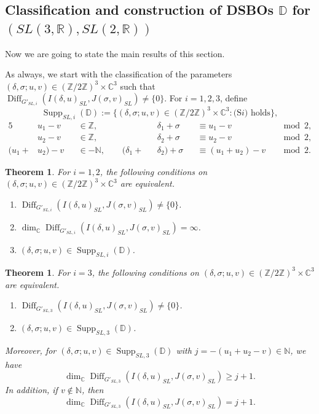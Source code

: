 \documentclass[a4paper,11pt,reqno]{amsart}
\newcommand{\DD}{\mathbb{D}}
\newcommand{\0}{{\bf 0}}
\newcommand{\N}{\mathbb{N}}
\newcommand{\Z}{\mathbb{Z}}
\newcommand{\R}{\mathbb{R}}
\newcommand{\C}{\mathbb{C}}
\newcommand{\1}{{\bf 1}}
\DeclareMathOperator{\Supp}{Supp}
\DeclareMathOperator{\Diff}{Diff}
\theoremstyle{plain}
\newtheorem{theorem}[equation]{Theorem}
\theoremstyle{definition}
\numberwithin{equation}{section}
\theoremstyle{definition}
\begin{document}
\subsection{Classification and construction of DSBOs \texorpdfstring{$\DD$}{D} 
for \texorpdfstring{$(SL(3,\R), SL(2,\R))$}{(SL(3,R),SL(2,R))}}\label{sec:class-const-SL}

Now we are going to state the main results of this section.

As always, we start with the classification of the parameters 
$(\delta,\sigma; u, v) \in (\Z/2\Z)^3\times \C^3$ such that
$\Diff_{G'_{SL,i}}(I(\delta,u)_{SL}, J(\sigma,v)_{SL})\neq \{0\}$.
For $i=1,2,3$, define
\begin{equation*}
\Supp_{SL,i}(\DD):=\{(\delta,\sigma; u, v) \in (\Z/2\Z)^3\times \C^3: 
\text{(S$i$)  holds}  \},
\end{equation*}
\begin{alignat}{5}
&u_1-v &&\in \Z,
\qquad
&&\delta_1+\sigma
&&\equiv u_1-v &&\bmod{2},
\tag{S1}\\
&u_2-v &&\in \Z,
\qquad
&&\delta_2+\sigma &&\equiv u_2-v &&\bmod{2},
\tag{S2}\\
(u_1+&u_2)-v &&\in -\N,
\qquad
(\delta_1+&&\delta_2)+\sigma &&\equiv (u_1+u_2)-v &&\bmod{2}.
\tag{S3}
\end{alignat}

\begin{theorem}\label{thm:classSL12}
For $i=1,2$, the following conditions on $(\delta,\sigma; u, v)  
\in (\Z/2\Z)^3\times \C^3$ are equivalent.
\begin{enumerate}[label=\normalfont{(\roman*)}]
\item $\Diff_{G'_{SL,i}}(I(\delta,u)_{SL}, J(\sigma,v)_{SL})\neq \{0\}$.
\item $\dim_\C\Diff_{G'_{SL,i}}(I(\delta,u)_{SL}, J(\sigma,v)_{SL})=\infty$.
\item $(\delta,\sigma; u, v) \in \Supp_{SL,i}(\DD)$.
\end{enumerate}
\end{theorem}

\begin{theorem}\label{thm:classSL3}
For $i=3$, the following conditions on 
$(\delta,\sigma; u, v)  \in (\Z/2\Z)^3\times \C^3$ are equivalent.
\begin{enumerate}[label=\normalfont{(\roman*)}]
\item $\Diff_{G'_{SL,3}}(I(\delta,u)_{SL}, J(\sigma,v)_{SL})\neq \{0\}$.
\item $(\delta,\sigma; u, v) \in \Supp_{SL,3}(\DD)$.
\end{enumerate}
Moreover, for $(\delta,\sigma; u, v)  \in \Supp_{SL,3}(\DD)$ with $j=-(u_1+u_2-v)\in\N$,
we have
\begin{equation}\label{eqn:DIffDimSL3}
\dim_\C\Diff_{G'_{SL,3}}(I(\delta,u)_{SL}, J(\sigma,v)_{SL}) \geq j+1.
\end{equation}
In addition,  if $v \notin \N$, then 
\begin{equation}\label{eqn:DIffDimSL3b}
\dim_\C\Diff_{G'_{SL,3}}(I(\delta,u)_{SL}, J(\sigma,v)_{SL}) = j+1.
\end{equation}
\end{theorem}
\end{document}
